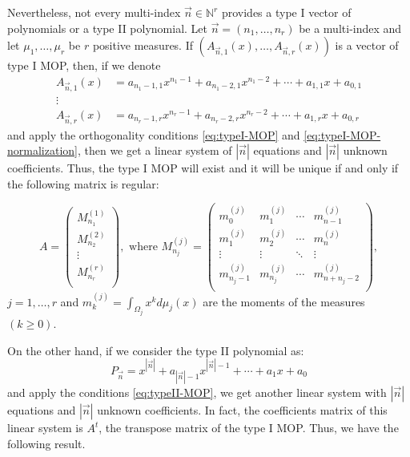 \documentclass[12pt,a4]{article}
\theoremstyle{plain}
\newcommand{\N}[0]{\mathbb{N}}
\begin{document}
Nevertheless, not every multi-index $\vec n\in\N^r$ provides a type I vector of polynomials or a type II polynomial. Let $\vec n = (n_1,\dots,n_r)$ be a multi-index and let $\mu_1,\dots,\mu_r$ be $r$ positive measures. If $(A_{\vec n, 1}(x), \dots, A_{\vec n, r}(x))$ is a vector of type I MOP, then, if we denote
\begin{equation}
    \begin{split}
        A_{\vec n,1}(x) &= a_{n_1-1,1}x^{n_1-1} + a_{n_1-2,1}x^{n_1-2} + \cdots + a_{1,1}x + a_{0,1} \\
        \vdots & \\
        A_{\vec n,r}(x) &= a_{n_r-1,r}x^{n_r-1} + a_{n_r-2,r}x^{n_r-2} + \cdots + a_{1,r}x + a_{0,r}
    \end{split}
\end{equation}
and apply the orthogonality conditions \eqref{eq:typeI-MOP} and \eqref{eq:typeI-MOP-normalization}, then we get a linear system of $|\vec n|$ equations and $|\vec n|$ unknown coefficients. Thus, the type I MOP will exist and it will be unique if and only if the following matrix is regular:

\begin{equation}
    \label{eq:MOP-matrix}
    A=\left(\begin{array}{c}
    M_{n_1}^{(1)} \\ \hline
    M_{n_2}^{(2)} \\ \hline
    \vdots \\ \hline
    M_{n_r}^{(r)} \\ 
\end{array}\right), \text{ \ \  where \ \ } M_{n_j}^{(j)} = \begin{pmatrix}
    m_0^{(j)} & m_1^{(j)} & \cdots & m_{n-1}^{(j)} \\
    m_1^{(j)} & m_2^{(j)} & \cdots & m_{n}^{(j)} \\
    \vdots & \vdots & \ddots & \vdots \\
    m_{n_j-1}^{(j)} & m_{n_j}^{(j)} & \cdots & m_{n+n_j-2}^{(j)} \\
\end{pmatrix},
\end{equation}
$j=1,\dots,r$ and $m_k^{(j)}=\displaystyle\int_{\Omega_j} x^k d\mu_j(x)$ are the moments of the measures $(k\geq 0)$.

On the other hand, if we consider the type II polynomial as:
$$
P_{\vec n} = x^{|\vec n|} + a_{|\vec n|-1} x^{|\vec n|-1} + \cdots + a_1 x + a_0
$$
and apply the conditions \eqref{eq:typeII-MOP}, we get another linear system with $|\vec n|$ equations and $|\vec n|$ unknown coefficients. In fact, the coefficients matrix of this linear system is $A^t$, the transpose matrix of the type I MOP. Thus, we have the following result.
\end{document}
